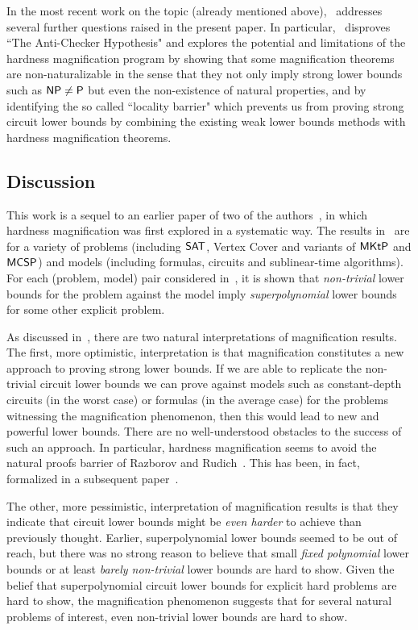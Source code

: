 \documentclass[11pt]{article}
\numberwithin{equation}{section}
\theoremstyle{definition}
\theoremstyle{plain}
\newcommand{\Ptime}{\ensuremath{{\sf P}}\xspace}
\newcommand{\NP}{\ensuremath{{\sf NP}}\xspace}
\newcommand{\SAT}{\ensuremath{{\sf SAT}}\xspace}
\newcommand{\MCSP}{\ensuremath{{\sf MCSP}}\xspace}
\newcommand{\MKtP}{\ensuremath{{\sf MKtP}}\xspace}
\begin{document}
In the most recent work on the topic (already mentioned above),~\cite{chen_et_al:LIPIcs:2020:11755} addresses several further questions raised in the present paper. In particular,~\cite{chen_et_al:LIPIcs:2020:11755} disproves ``The Anti-Checker Hypothesis" and explores the potential and limitations of the hardness magnification program by showing that some magnification theorems are non-naturalizable in the sense that they not only imply strong lower bounds such as $\NP\ne \Ptime$ but even the non-existence of natural properties, and by identifying the so called ``locality barrier" which prevents us from proving strong circuit lower bounds by combining the existing weak lower bounds methods with hardness magnification theorems.




\subsection{Discussion}\label{ss:discussion}

This work is a sequel to an earlier paper of two of the authors~\cite{OS18}, in which hardness magnification was first explored in a systematic way. The results in~\cite{OS18} are for a variety of problems (including $\SAT$, Vertex Cover and variants of $\MKtP$ and $\MCSP$) and models (including formulas, circuits and sublinear-time algorithms). For each (problem, model) pair considered in~\cite{OS18}, it is shown that \emph{non-trivial} lower bounds for the problem against the model imply \emph{superpolynomial} lower bounds for some other explicit problem.

As discussed in~\cite{OS18}, there are two natural interpretations of magnification results. The first, more optimistic, interpretation is that magnification constitutes a new approach to proving strong lower bounds. If we are able to replicate the non-trivial circuit lower bounds we can prove against models such as constant-depth circuits (in the worst case) or formulas (in the average case) for the problems witnessing the magnification phenomenon, then this would lead to new and powerful lower bounds. There are no well-understood obstacles to the success of such an approach. In particular, hardness magnification seems to avoid the natural proofs barrier of Razborov and Rudich~\cite{DBLP:journals/jcss/RazborovR97}. This has been, in fact, formalized in a subsequent %
paper~\cite{chen_et_al:LIPIcs:2020:11755}.

The other, more pessimistic, interpretation of magnification results is that they indicate that circuit lower bounds might be \emph{even harder} to achieve than previously thought. Earlier, superpolynomial lower bounds seemed to be out of reach, but there was no strong %
reason  %
to believe that small \emph{fixed polynomial} lower bounds or at least \emph{barely non-trivial} lower bounds
are hard to show. Given the belief that superpolynomial circuit lower bounds for explicit hard problems are hard to show, the magnification phenomenon suggests that for several natural problems of interest, even non-trivial lower bounds are hard to show.
\end{document}
